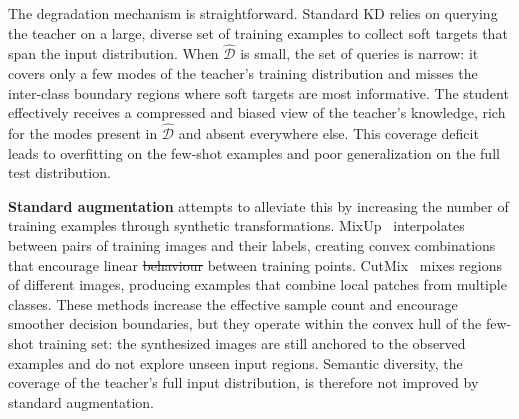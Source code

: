 \documentclass[12pt, a4paper, twoside]{book}
\makeatletter
\numberwithin{equation}{chapter}
\theoremstyle{plain}
\theoremstyle{definition}
\theoremstyle{remark}
\newenvironment{foldable}{}{}
\providecommand{\DIFaddtex}[1]{{\protect\color{blue}\uwave{#1}}} %
\providecommand{\DIFdeltex}[1]{{\protect\color{red}\sout{#1}}} %
\providecommand{\DIFaddbegin}{} %
\providecommand{\DIFaddend}{} %
\providecommand{\DIFdelbegin}{} %
\providecommand{\DIFdelend}{} %
\providecommand{\DIFadd}[1]{\texorpdfstring{\DIFaddtex{#1}}{#1}} %
\providecommand{\DIFdel}[1]{\texorpdfstring{\DIFdeltex{#1}}{}} %
\newcommand{\DIFscaledelfig}{0.5}
\newlength{\DIFdelgraphicswidth} %
\newlength{\DIFdelgraphicsheight} %
\newcommand{\DIFaddincludegraphics}[2][]{{\color{blue}\fbox{\DIFOincludegraphics[#1]{#2}}}} %
\newcommand{\DIFdelincludegraphics}[2][]{%
\sbox{\DIFdelgraphicsbox}{\DIFOincludegraphics[#1]{#2}}%
\settoboxwidth{\DIFdelgraphicswidth}{\DIFdelgraphicsbox} %
\settoboxtotalheight{\DIFdelgraphicsheight}{\DIFdelgraphicsbox} %
\scalebox{\DIFscaledelfig}{%
\parbox[b]{\DIFdelgraphicswidth}{\usebox{\DIFdelgraphicsbox}\\[-\baselineskip] \rule{\DIFdelgraphicswidth}{0em}}\llap{\resizebox{\DIFdelgraphicswidth}{\DIFdelgraphicsheight}{%
\setlength{\unitlength}{\DIFdelgraphicswidth}%
\begin{picture}(1,1)%
\thicklines\linethickness{2pt} %
{\color[rgb]{1,0,0}\put(0,0){\framebox(1,1){}}}%
{\color[rgb]{1,0,0}\put(0,0){\line( 1,1){1}}}%
{\color[rgb]{1,0,0}\put(0,1){\line(1,-1){1}}}%
\end{picture}%
}\hspace*{3pt}}} %
} %
\DeclareRobustCommand{\DIFaddbegin}{\DIFOaddbegin \let\includegraphics\DIFaddincludegraphics} %
\DeclareRobustCommand{\DIFaddend}{\DIFOaddend \let\includegraphics\DIFOincludegraphics} %
\DeclareRobustCommand{\DIFdelbegin}{\DIFOdelbegin \let\includegraphics\DIFdelincludegraphics} %
\DeclareRobustCommand{\DIFdelend}{\DIFOaddend \let\includegraphics\DIFOincludegraphics} %
\let\sout@orig\sout %
\renewcommand{\sout}[1]{\ifmmode\text{\sout@orig{\ensuremath{#1}}}\else\sout@orig{#1}\fi} %
\makeatother
\begin{document}
\begin{foldable}
  The degradation mechanism is straightforward.
  Standard \ac{KD} relies on querying the teacher on a large, diverse set of training examples to collect soft targets that span the input distribution.
  When $\hat{\mathcal{D}}$ is small, the set of queries is narrow: it covers only a few modes of the teacher's training distribution and misses the inter-class boundary regions where soft targets are most informative.
  The student effectively receives a compressed and biased view of the teacher's knowledge, rich for the modes present in $\hat{\mathcal{D}}$ and absent everywhere else.
  This coverage deficit leads to overfitting on the few-shot examples and poor generalization on the full test distribution.
\end{foldable}

\begin{foldable}
  \textbf{Standard augmentation} attempts to alleviate this by increasing the number of training examples through synthetic transformations.
  MixUp~\cite{zhang2018mixup} interpolates between pairs of training images and their labels, creating convex combinations that encourage linear \DIFdelbegin \DIFdel{behaviour }\DIFdelend \DIFaddbegin \DIFadd{behavior }\DIFaddend between training points.
  CutMix~\cite{yun2019cutmix} mixes regions of different images, producing examples that combine local patches from multiple classes.
  These methods increase the effective sample count and encourage smoother decision boundaries, but they operate within the convex hull of the few-shot training set: the synthesized images are still anchored to the observed examples and do not explore unseen input regions.
  Semantic diversity, the coverage of the teacher's full input distribution, is therefore not improved by standard augmentation.
\end{foldable}
\end{document}
